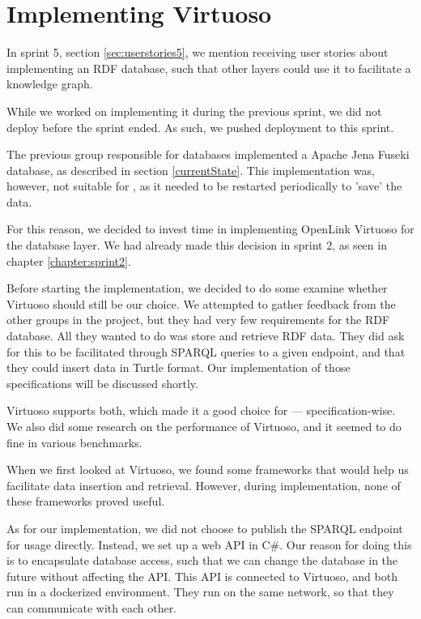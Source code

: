 \section{Implementing Virtuoso}
In sprint 5, section \ref{sec:userstories5}, we mention receiving user stories about implementing an RDF database, such that other \knox{} layers could use it to facilitate a knowledge graph.

While we worked on implementing it during the previous sprint, we did not deploy before the sprint ended. As such, we pushed deployment to this sprint.

The previous group responsible for \knox{} databases implemented a Apache Jena Fuseki database, as described in section \ref{currentState}.
This implementation was, however, not suitable for \knox{}, as it needed to be restarted periodically to 'save' the data.

For this reason, we decided to invest time in implementing OpenLink Virtuoso for the \knox{} database layer. We had already made this decision in sprint 2, as seen in chapter \ref{chapter:sprint2}.

Before starting the implementation, we decided to do some examine whether Virtuoso should still be our choice.
We attempted to gather feedback from the other groups in the \knox{} project, but they had very few requirements for the RDF database. All they wanted to do was store and retrieve RDF data.
They did ask for this to be facilitated through SPARQL queries to a given endpoint, and that they could insert data in Turtle format. Our implementation of those specifications will be discussed shortly.

Virtuoso supports both, which made it a good choice for \knox{} --- specification-wise. We also did some research on the performance of Virtuoso, and it seemed to do fine in various benchmarks\cite{addleseeComparingLinkedData2019}\cite{jovanovikBenchmarkingVirtuosoMighty2018}.

When we first looked at Virtuoso, we found some frameworks that would help us facilitate data insertion and retrieval. However, during implementation, none of these frameworks proved useful.

As for our implementation, we did not choose to publish the SPARQL endpoint for \knox{} usage directly. Instead, we set up a web API in C\#.
Our reason for doing this is to encapsulate database access, such that we can change the database in the future without affecting the API.
This API is connected to Virtuoso, and both run in a dockerized environment. They run on the same network, so that they can communicate with each other.

